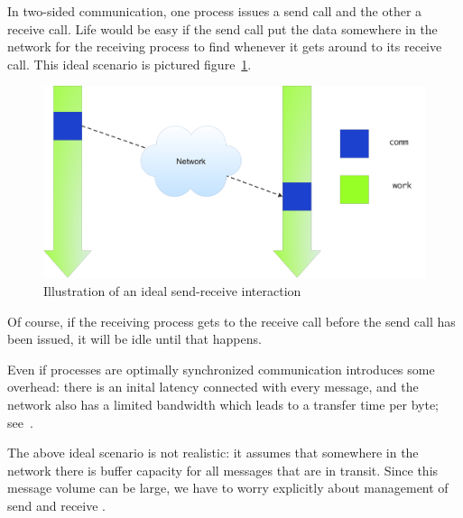 In two-sided communication, one process issues a send call and the
other a receive call. Life would be easy if the send call put the data
somewhere in the network for the receiving process to find whenever it
gets around to its receive call. This ideal scenario is pictured
figure~\ref{fig:send-ideal}.
\begin{figure}[ht]
\includegraphics[scale=.1]{graphics/send-ideal}
\caption{Illustration of an ideal send-receive interaction}
\label{fig:send-ideal}
\end{figure}
Of course, if the receiving process gets to the receive call before
the send call has been issued, it will be idle until that happens.

Even if processes are optimally synchronized communication introduces
some overhead: there is an inital latency connected with every
message, and the network also has a limited bandwidth which leads to a
transfer time per byte; see~.

The above ideal scenario is not realistic: it assumes that somewhere
in the network there is buffer capacity for all messages that are in
transit. Since this message volume can be large, we have to worry
explicitly about management of send and receive .

